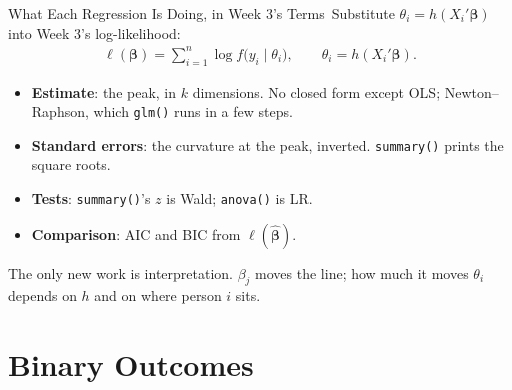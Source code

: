 \documentclass[aspectratio=169,11pt,xcolor=dvipsnames]{beamer}
\newcommand{\loglik}{\ell}
\newcommand{\core}{\,\raisebox{0.6pt}{\textcolor{corestar}{$\bigstar$}}}
\begin{document}
\begin{frame}{What Each Regression Is Doing, in Week 3's Terms\core}
Substitute $\theta_i = h(X_i'\bm\beta)$ into Week 3's log-likelihood:
\begingroup
\setlength{\abovedisplayskip}{2pt}\setlength{\belowdisplayskip}{2pt}
\begin{align*}
  \loglik(\bm\beta) = \sum_{i=1}^n \log f\big(y_i \mid \theta_i\big),
  \qquad \theta_i = h(X_i'\bm\beta) .
\end{align*}
\endgroup
\begin{itemize}\itemsep3pt
  \item \textbf{Estimate}: the peak, in $k$ dimensions. No closed form
        except OLS; Newton--Raphson, which \texttt{glm()} runs in a few
        steps.
  \item \textbf{Standard errors}: the curvature at the peak, inverted.
        \texttt{summary()} prints the square roots.
  \item \textbf{Tests}: \texttt{summary()}'s $z$ is Wald; \texttt{anova()}
        is LR.
  \item \textbf{Comparison}: AIC and BIC from $\loglik(\hat{\bm\beta})$.
\end{itemize}
\vskip3pt
\alert{The only new work is interpretation.} $\beta_j$ moves the line; how
much it moves $\theta_i$ depends on $h$ and on where person $i$ sits.
\end{frame}

\section[Binary]{Binary Outcomes}
\begin{frame}\sectionpage\end{frame}
\end{document}
